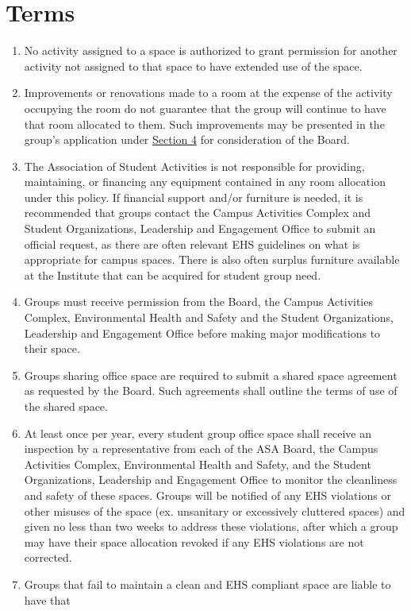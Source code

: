 \documentclass[12pt]{article}
\begin{document}
\section{Terms}
\label{art:VII_sect7}
\begin{enumerate}
    \item No activity assigned to a space is authorized to grant permission for another activity
not assigned to that space to have extended use of the space.
    \item Improvements or renovations made to a room at the expense of the activity occupying the
room do not guarantee that the group will continue to have that room allocated to them.
Such improvements may be presented in the group’s application under \hyperref[art:VII_sect4]{Section 4} for
consideration of the Board.
    \item The Association of Student Activities is not responsible for providing, maintaining, or
financing any equipment contained in any room allocation under this policy. If financial
support and/or furniture is needed, it is recommended that groups contact the Campus
Activities Complex and Student Organizations, Leadership and Engagement Office to submit
an official request, as there are often relevant EHS guidelines on what is appropriate for
campus spaces. There is also often surplus furniture available at the Institute that can be
acquired for student group need.
    \item Groups must receive permission from the Board, the Campus Activities Complex,
Environmental Health and Safety and the Student Organizations, Leadership and
Engagement Office before making major modifications to their space.
    \item Groups sharing office space are required to submit a shared space agreement as
requested by the Board. Such agreements shall outline the terms of use of the shared
space.
    \item At least once per year, every student group office space shall receive an inspection by a
representative from each of the ASA Board, the Campus Activities Complex,
Environmental Health and Safety, and the Student Organizations, Leadership and
Engagement Office to monitor the cleanliness and safety of these spaces. Groups will be
notified of any EHS violations or other misuses of the space (ex. unsanitary or
excessively cluttered spaces) and given no less than two weeks to address these
violations, after which a group may have their space allocation revoked if any EHS
violations are not corrected.
    \item Groups that fail to maintain a clean and EHS compliant space are liable to have that

\end{enumerate}
\end{document}
